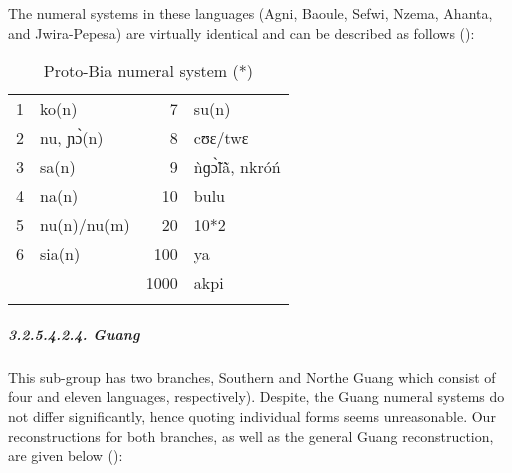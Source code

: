 The numeral systems in these languages (Agni, Baoule, Sefwi, Nzema, Ahanta, and Jwira-Pepesa) are virtually identical and can be described as follows ():

\begin{table}
\caption{\label{tab:3:75}Proto-Bia numeral system (*)}


\begin{tabularx}{\textwidth}{lXrX}
\lsptoprule

1 & ko(n) & 7 & su(n)\\
2 & nu, ɲ{\`{ɔ}}(n) & 8 & cʊɛ/twɛ\\
3 & sa(n) & 9 & {\`{n}}ɡ{\`{\~ɔ}}l{\`{\~a}}, nkró{\'{n}} \\
4 & na(n) & 10 & bulu\\
5 & nu(n)/nu(m) & 20 & 10*2\\
6 & sia(n) & 100 & ya\\
~ &  & 1000 & akpi\\
\lspbottomrule
\end{tabularx}
\end{table}

\clearpage 
\subparagraph{3.2.5.4.2.4. Guang}

This sub-group has two branches, Southern and Northe Guang which consist of four and eleven languages, respectively). Despite, the Guang numeral systems do not differ significantly, hence quoting individual forms seems unreasonable. Our reconstructions for both branches, as well as the general Guang reconstruction, are given below ():

